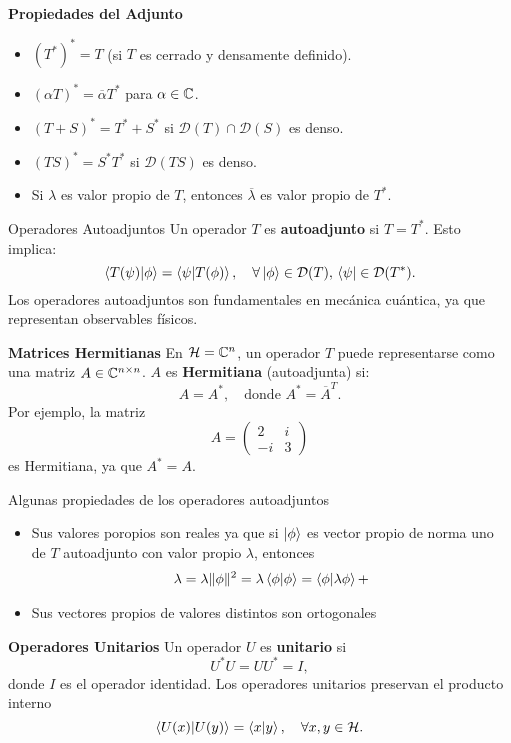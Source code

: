 \documentclass[main.tex]{subfiles}
\begin{document}
\noindent\textbf{Propiedades del Adjunto}
\begin{itemize}
  \item $(T^*)^* = T$ (si $T$ es cerrado y densamente definido).
  \item $(\alpha T)^* = \overline{\alpha} T^*$ para $\alpha \in \mathbb C $.
  \item $(T + S)^* = T^* + S^*$ si $\mathcal{D}(T) \cap \mathcal{D}(S)$ es denso.
  \item $(TS)^* = S^* T^*$ si $\mathcal{D}(TS)$ es denso.
  \item Si $\lambda$ es valor propio de $T$, entonces $\overline{\lambda}$ es valor propio de $T^{*}$.
\end{itemize}
\dem
\begin{def.}{Operadores Autoadjuntos}
Un operador $T$ es \textbf{autoadjunto} si $T = T^*$. Esto implica:
\[
  \braket{T(\psi)|\phi}=\braket{\psi| T(\phi)}, \quad \forall \ket{\phi} \in \mathcal{D}(T), \, \bra{\psi} \in \mathcal{D}(T^*).
\]
Los operadores autoadjuntos son fundamentales en mecánica cuántica, ya que representan observables físicos.
\end{def.}
\eje\textbf{Matrices Hermitianas}
En $\mathcal{H} = \mathbb{C}^n$, un operador $T$ puede representarse como una matriz $A\in\mathbb C ^{n \times n}$. $A$ es \textbf{Hermitiana} (autoadjunta) si:
\[
A = A^*, \quad \text{donde } A^* = \overline{A}^T.
\]
Por ejemplo, la matriz
\[
A = \begin{pmatrix}
2 & i \\
-i & 3
\end{pmatrix}
\]
es Hermitiana, ya que $A^* = A$.

Algunas propiedades de los operadores autoadjuntos
\begin{itemize}
  \item Sus valores poropios son reales ya que si \(\ket{\phi}\) es vector propio de norma uno de $T$ autoadjunto con valor propio \(\lambda\), entonces
        \begin{align*}
        \lambda=\lambda\|\phi\|^{2}=\lambda\braket{\phi|\phi}=\braket{\phi|\lambda\phi}+
        \end{align*}
  \item Sus vectores propios de valores distintos son ortogonales
\end{itemize}
\eje\textbf{Operadores Unitarios}
Un operador $U$ es \textbf{unitario} si
\[
U^* U = U U^* = I,
\]
donde $I$ es el operador identidad. Los operadores unitarios preservan el producto interno
\[
\braket{ U(x)| U(y)} = \braket{ x | y}, \quad \forall x, y \in \mathcal{H}.
\]
\end{document}
